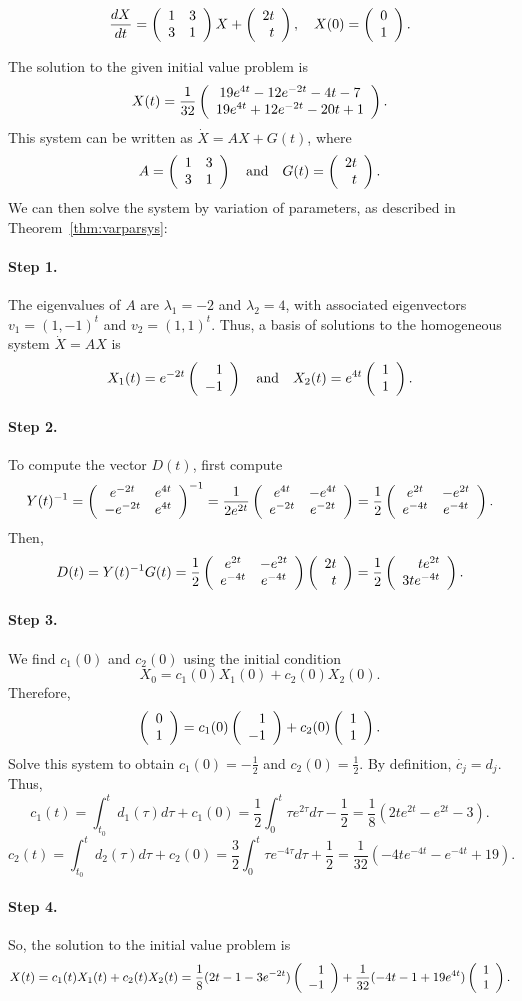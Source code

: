 \documentclass{ximera}
\begin{document}
\begin{exercise}  \label{c14.3.1b}
\[
\frac{dX}{dt}=\left(\begin{array}{rr} 1 & 3\\ 3 &1\end{array}\right) X + \left(\begin{array}{r} 2t \\ t\end{array}\right),\quad
X(0) = \left(\begin{array}{r} 0 \\ 1\end{array}\right).
\]

\begin{solution}
\ans The solution to the given initial value problem is
\[
X(t) = \frac{1}{32}\left(\begin{array}{c} 19e^{4t} - 12e^{-2t} - 4t - 7 \\ 19e^{4t} + 12e^{-2t} - 20t + 1\end{array}\right).
\]
\soln This system can be written as $\dot{X} = AX + G(t)$, where
\[
A = \left(\begin{array}{rr} 1 & 3\\ 3 &1\end{array}\right) \quad\mbox{and}\quad G(t) = \left(\begin{array}{r} 2t \\ t\end{array}\right).
\]
We can then solve the system by variation of parameters, as described in
Theorem~\ref{thm:varparsys}:

\paragraph{Step 1.} The eigenvalues of $A$ are $\lambda_1 = -2$ and
$\lambda_2 = 4$, with associated eigenvectors $v_1 = (1,-1)^t$ and
$v_2 = (1,1)^t$.  Thus, a basis of solutions to the homogeneous system
$\dot{X} = AX$ is
\[
X_1(t) = e^{-2t}\left(\begin{array}{r} 1 \\ -1\end{array}\right) \quad\mbox{and}\quad X_2(t) = e^{4t}\left(\begin{array}{r} 1 \\ 1\end{array}\right).
\]
\paragraph{Step 2.} To compute the vector $D(t)$, first compute
\[
Y(t)^{-1} = \left(\begin{array}{cc} e^{-2t} & e^{4t}\\ -e^{-2t} &e^{4t}\end{array}\right)^{-1}
= \frac{1}{2e^{2t}}\left(\begin{array}{cc} e^{4t} & -e^{4t}\\ e^{-2t} &e^{-2t}\end{array}\right)
= \frac{1}{2}\left(\begin{array}{cc} e^{2t} & -e^{2t}\\ e^{-4t} &e^{-4t}\end{array}\right).
\]
Then,
\[
D(t) = Y(t)^{-1}G(t) =
\frac{1}{2}\left(\begin{array}{cc} e^{2t} & -e^{2t}\\ e^{-4t} &e^{-4t}\end{array}\right)\left(\begin{array}{r} 2t \\ t\end{array}\right) =
\frac{1}{2}\left(\begin{array}{r} te^{2t} \\ 3te^{-4t}\end{array}\right).
\]
\paragraph{Step 3.} We find $c_1(0)$ and $c_2(0)$ using the initial
condition
\[
X_0 = c_1(0)X_1(0) + c_2(0)X_2(0).
\]
Therefore,
\[
\left(\begin{array}{r} 0 \\ 1\end{array}\right) = c_1(0)\left(\begin{array}{r} 1 \\ -1\end{array}\right) + c_2(0)\left(\begin{array}{r} 1 \\ 1\end{array}\right).
\]
Solve this system to obtain $c_1(0) = -\frac{1}{2}$ and $c_2(0) =
\frac{1}{2}$.  By definition, $\dot{c_j} = d_j$.  Thus,
\[
c_1(t) = \int_{t_0}^td_1(\tau)d\tau + c_1(0)
= \frac{1}{2}\int_0^t \tau e^{2\tau}d\tau - \frac{1}{2}
= \frac{1}{8}(2te^{2t} - e^{2t} - 3).
\]
\[
c_2(t) = \int_{t_0}^td_2(\tau)d\tau + c_2(0)
= \frac{3}{2}\int_0^t \tau e^{-4\tau}d\tau + \frac{1}{2}
= \frac{1}{32}(-4te^{-4t} - e^{-4t} + 19).
\]

\paragraph{Step 4.} So, the solution to the initial value problem is
\[
X(t) = c_1(t)X_1(t) + c_2(t)X_2(t)
= \frac{1}{8}(2t - 1 - 3e^{-2t})\left(\begin{array}{r} 1 \\ -1\end{array}\right) +
\frac{1}{32}(-4t - 1 + 19e^{4t})\left(\begin{array}{r} 1 \\ 1\end{array}\right).
\]


\end{solution}
\end{exercise}
\end{document}
